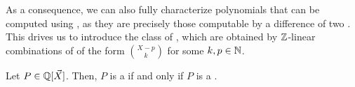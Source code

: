\AP As a consequence, we can also fully characterize polynomials that can be
computed using , as they are precisely those
computable by a difference of two . This drives
us to introduce the class of , which are
obtained by $\mathbb{Z}$-linear combinations of  of the form
$\binom{X - p}{k}$ for some $k,p \in \mathbb{N}$. 

\begin{corollary}
    \label{integer-binomial-polynomials:cor}
    Let $P \in \mathbb{Q}[\vec{X}]$. Then, $P$ is a 
    if and only if $P$ is a .
\end{corollary}


